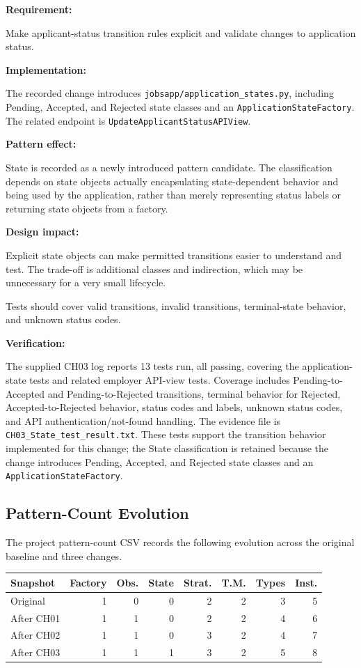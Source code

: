 \documentclass[11pt,a4paper]{article}
\newcommand{\code}[1]{\texttt{#1}}
\begin{document}
\textbf{Requirement:}


Make applicant-status transition rules explicit and
validate changes to application status.

\textbf{Implementation:}

The recorded change introduces
\code{jobsapp/application\_states.py}, including Pending,
Accepted, and Rejected state classes and an
\code{ApplicationStateFactory}. The related endpoint is
\code{UpdateApplicantStatusAPIView}.


\textbf{Pattern effect:}

State is recorded as a newly introduced pattern candidate.
The classification depends on state objects actually
encapsulating state-dependent behavior and being used by
the application, rather than merely representing status
labels or returning state objects from a factory.

\textbf{Design impact:}

Explicit state objects can make permitted transitions
easier to understand and test. The trade-off is additional
classes and indirection, which may be unnecessary for a
very small lifecycle.

Tests should cover valid transitions, invalid transitions,
terminal-state behavior, and unknown status codes.



\textbf{Verification:}

The supplied CH03 log reports 13 tests run, all passing, covering the
application-state tests and related employer API-view tests. Coverage
includes Pending-to-Accepted and Pending-to-Rejected transitions,
terminal behavior for Rejected, Accepted-to-Rejected behavior, status
codes and labels, unknown status codes, and API authentication/not-found
handling. The evidence file is \code{CH03\_State\_test\_result.txt}.
These tests support the transition behavior implemented for this change;
the State classification is retained because the change introduces
Pending, Accepted, and Rejected state classes and an
\code{ApplicationStateFactory}.


\subsection{Pattern-Count Evolution}

The project pattern-count CSV records the following
evolution across the original baseline and three changes.

\begin{center}
\begin{tabularx}{\linewidth}{@{}lrrrrrrr@{}}
\toprule
Snapshot & Factory & Obs. & State & Strat. & T.M. & Types & Inst.\\
\midrule
Original & 1 & 0 & 0 & 2 & 2 & 3 & 5\\
After CH01 & 1 & 1 & 0 & 2 & 2 & 4 & 6\\
After CH02 & 1 & 1 & 0 & 3 & 2 & 4 & 7\\
After CH03 & 1 & 1 & 1 & 3 & 2 & 5 & 8\\
\bottomrule
\end{tabularx}
\end{center}
\end{document}
